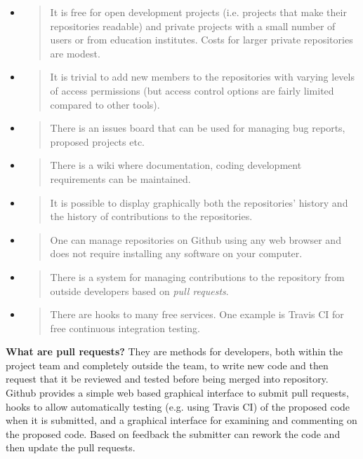 \documentclass[]{article}
\begin{document}
\begin{itemize}
\item
  \begin{quote}
  It is free for open development projects (i.e. projects that make
  their repositories readable) and private projects with a small number
  of users or from education institutes. Costs for larger private
  repositories are modest.
  \end{quote}
\item
  \begin{quote}
  It is trivial to add new members to the repositories with varying
  levels of access permissions (but access control options are fairly
  limited compared to other tools).
  \end{quote}
\item
  \begin{quote}
  There is an issues board that can be used for managing bug reports,
  proposed projects etc.
  \end{quote}
\item
  \begin{quote}
  There is a wiki where documentation, coding development requirements
  can be maintained.
  \end{quote}
\item
  \begin{quote}
  It is possible to display graphically both the repositories' history
  and the history of contributions to the repositories.
  \end{quote}
\item
  \begin{quote}
  One can manage repositories on Github using any web browser and does
  not require installing any software on your computer.
  \end{quote}
\item
  \begin{quote}
  There is a system for managing contributions to the repository from
  outside developers based on \emph{pull requests}.
  \end{quote}
\item
  \begin{quote}
  There are hooks to many free services. One example is Travis CI for
  free continuous integration testing.
  \end{quote}
\end{itemize}

\textbf{What are pull requests?} They are methods for developers, both
within the project team and completely outside the team, to write new
code and then request that it be reviewed and tested before being merged
into repository. Github provides a simple web based graphical interface
to submit pull requests, hooks to allow automatically testing (e.g.
using Travis CI) of the proposed code when it is submitted, and a
graphical interface for examining and commenting on the proposed code.
Based on feedback the submitter can rework the code and then update the
pull requests.
\end{document}

